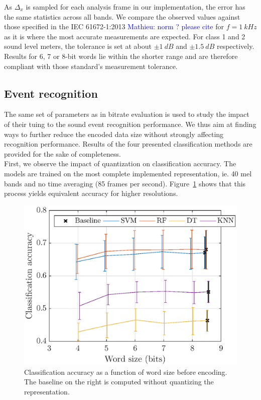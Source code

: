 \documentclass[final,3p,times,twocolumn]{elsarticle}
\newcommand{\ml}[1]{\textcolor{blue}{ Mathieu: #1}}
\begin{document}
As $\Delta_x$ is sampled for each analysis frame in our implementation, the error has the same statistics across all bands. We compare the observed values against those specified in the IEC 61672-1:2013 \ml{norm ? please cite} for $f = 1~kHz$ as it is where the most accurate measurements are expected. For class 1 and 2 sound level meters, the tolerance is set at about $\pm 1~dB$ and $\pm 1.5~dB$ respectively. Results for 6, 7 or 8-bit words lie within the shorter range and are therefore compliant with those standard's measurement tolerance.

\subsection{Event recognition}

The same set of parameters as in bitrate evaluation is used to study the impact of their tuing to the sound event recognition performance. We thus aim at finding ways to further reduce the encoded data size without strongly affecting recognition performance. Results of the four presented classification methods are provided for the sake of completeness.\\

First, we observe the impact of quantization on classification accuracy. The models are trained on the most complete implemented representation, ie. 40 mel bands and no time averaging (85 frames per second). Figure~\ref{fig:class_mel_q} shows that this process yields equivalent accuracy for higher resolutions.\\

\begin{figure}[htbp]
	\centering
		\includegraphics[width=\columnwidth]{class_mel_q.eps}
	\caption{Classification accuracy as a function of word size before encoding. The baseline on the right is computed without quantizing the representation.}
	\label{fig:class_mel_q}
\end{figure}
\end{document}
